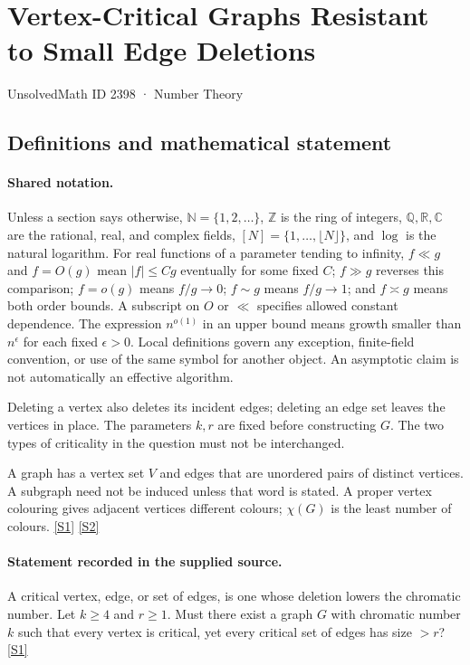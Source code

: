 \documentclass[11pt,a4paper]{article}
\newcommand{\N}{\mathbb{N}}
\newcommand{\Z}{\mathbb{Z}}
\newcommand{\Q}{\mathbb{Q}}
\newcommand{\R}{\mathbb{R}}
\newcommand{\C}{\mathbb{C}}
\newcommand{\sref}[2]{\hyperlink{source:#1:#2}{[S#2]}}
\begin{document}

\setcounter{section}{2397}

\section{Vertex-Critical Graphs Resistant to Small Edge Deletions}\label{2398}

{\small\sffamily UnsolvedMath ID 2398 · Number Theory}

\subsection{Definitions and mathematical statement}

\paragraph{Shared notation.}Unless a section says otherwise, $\N=\{1,2,\ldots\}$,
$\Z$ is the ring of integers, $\Q,\R,\C$ are the rational, real, and complex
fields, $[N]=\{1,\ldots,\lfloor N\rfloor\}$, and $\log$ is the natural
logarithm. For real functions of a parameter tending to infinity,
$f\ll g$ and $f=O(g)$ mean $|f|\leq Cg$ eventually for some fixed $C$;
$f\gg g$ reverses this comparison; $f=o(g)$ means $f/g\to0$;
$f\sim g$ means $f/g\to1$; and $f\asymp g$ means both order bounds.
A subscript on $O$ or $\ll$ specifies allowed constant dependence.
The expression $n^{o(1)}$ in an upper bound means growth smaller than
$n^\epsilon$ for each fixed $\epsilon>0$. Local definitions govern any
exception, finite-field convention, or use of the same symbol for another
object. An asymptotic claim is not automatically an effective algorithm.



Deleting a vertex also deletes its incident edges; deleting an edge set leaves the vertices in place. The parameters $k,r$ are fixed before constructing $G$. The two types of criticality in the question must not be interchanged.

A graph has a vertex set $V$ and edges that are unordered pairs of distinct vertices. A subgraph need not be induced unless that word is stated. A proper vertex colouring gives adjacent vertices different colours; $\chi(G)$ is the least number of colours. \sref{2398}{1} \sref{2398}{2}

\paragraph{Statement recorded in the supplied source.}
A critical vertex, edge, or set of edges, is one whose deletion lowers the chromatic number.
Let $k\geq 4$ and $r\geq 1$. Must there exist a graph $G$ with chromatic number $k$ such that every vertex is critical, yet every critical set of edges has size $>r$? \sref{2398}{1}
\end{document}
